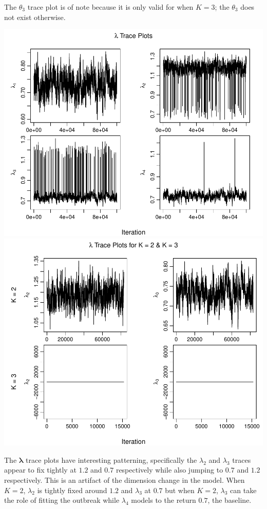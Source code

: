 \documentclass[11pt,a4paper]{article}
\numberwithin{equation}{section}
\begin{document}
The \(\theta_3\) trace plot is of note because it is only valid for when
\(K = 3\); the \(\theta_3\) does not exist otherwise.

\includegraphics{thesis_draft_files/figure-latex/unnamed-chunk-3-1.pdf}
\includegraphics{thesis_draft_files/figure-latex/unnamed-chunk-3-2.pdf}

The \(\boldsymbol{\lambda}\) trace plots have interesting patterning,
specifically the \(\lambda_2\) and \(\lambda_3\) traces appear to fix
tightly at \(1.2\) and \(0.7\) respectively while also jumping to
\(0.7\) and \(1.2\) respectively. This is an artifact of the dimension
change in the model. When \(K = 2\), \(\lambda_2\) is tightly fixed
around \(1.2\) and \(\lambda_3\) at \(0.7\) but when \(K = 2\),
\(\lambda_3\) can take the role of fitting the outbreak while
\(\lambda_4\) models to the return \(0.7\), the baseline.
\end{document}
